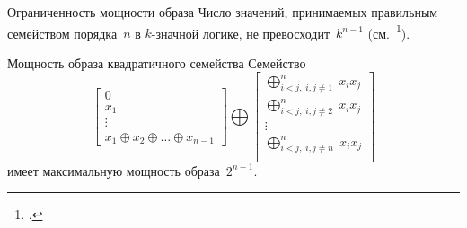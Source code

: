 \begin{frame}%

    \begin{mypropos}{Ограниченность мощности образа}
        Число значений, принимаемых правильным семейством порядка~$n$ в $k$-значной логике, не превосходит~$k^{n-1}$ (см.~\footcite{galatenko23}).
    \end{mypropos}

    \begin{mytheorem}{Мощность образа квадратичного семейства}
        Семейство 
        \begin{equation}
            \begin{bmatrix}
            0 \\
            x_1 \\
            \vdots \\
            x_1 \oplus x_2 \oplus \ldots \oplus x_{n-1}
            \end{bmatrix}
            \bigoplus
            \begin{bmatrix}
            \bigoplus_{i < j, \; i, j \ne 1}^n \; x_i x_j \\
            \bigoplus_{i < j, \; i, j \ne 2}^n \; x_i x_j \\
            \vdots \\
            \bigoplus_{i < j, \; i, j \ne n}^n \; x_i x_j \\
            \end{bmatrix}
        \end{equation}
        имеет максимальную мощность образа~$2^{n-1}$.
    \end{mytheorem}
\end{frame}


